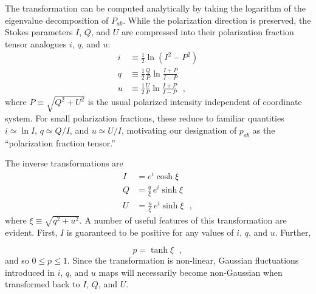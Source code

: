 \documentclass[twocolumn]{aastex631}
\begin{document}
The transformation can be computed analytically by taking the logarithm of the eigenvalue decomposition of $P_{ab}$. While the polarization direction is preserved, the Stokes parameters $I$, $Q$, and $U$ are compressed into their polarization fraction tensor analogues $i$, $q$, and $u$:
\begin{align}\label{eq:real2pt}
    i &\equiv \frac{1}{2} \ln (I^2 - P^2)\nonumber  \\
    q &\equiv  \frac{1}{2}\frac{Q}{P} \ln \frac{I+P}{I-P} \\
    u &\equiv  \frac{1}{2}\frac{U}{P} \ln \frac{I+P}{I-P}\nonumber 
    ~~~,
\end{align}
where $P \equiv \sqrt{Q^2 + U^2}$ is the usual polarized intensity independent of coordinate system. For small polarization fractions, these reduce to familiar quantities $i\simeq\ln I$, $q\simeq Q/I$, and $u\simeq U/I$, motivating our designation of $p_{ab}$ as the ``polarization fraction tensor.''

The inverse transformations are
\begin{align}\label{eq:pt2real}
    I &= e^i \cosh \xi \nonumber \\
    Q &= \frac{q}{\xi}\,e^i\sinh \xi  \\
    U &= \frac{u}{\xi}\,e^i\sinh \xi \nonumber
    ~~~,
\end{align}
where $\xi \equiv \sqrt{q^2 + u^2}$. A number of useful features of this transformation are evident. First, $I$ is guaranteed to be positive for any values of $i$, $q$, and $u$. Further,

\begin{equation}
    p = \tanh\xi
    ~~~,
\end{equation}
and so $0 \leq p \leq 1$. Since the transformation is non-linear, Gaussian fluctuations introduced in $i$, $q$, and $u$ maps will necessarily become non-Gaussian when transformed back to $I$, $Q$, and $U$.
\end{document}
